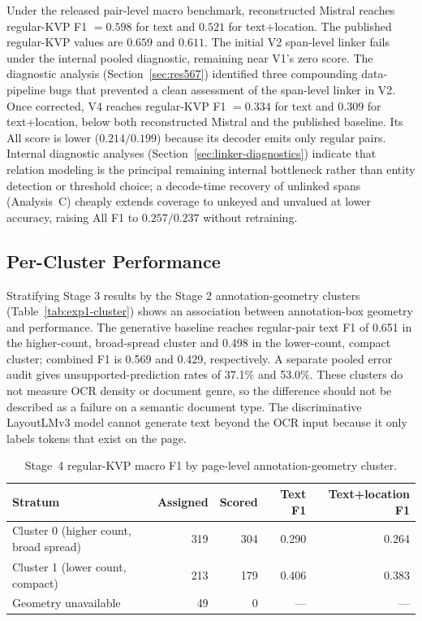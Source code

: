 Under the released pair-level macro benchmark, reconstructed Mistral reaches
regular-KVP F1 $=0.598$ for text and $0.521$ for text+location. The published
regular-KVP values are $0.659$ and $0.611$. The initial V2 span-level linker
fails under the internal pooled diagnostic, remaining near V1's zero score.
The diagnostic analysis (Section~\ref{sec:res567}) identified three compounding
data-pipeline bugs that prevented a clean assessment of the span-level linker
in V2. Once corrected, V4 reaches regular-KVP F1 $=0.334$ for text
and $0.309$ for text+location, below both reconstructed Mistral and the
published baseline. Its All score is lower ($0.214/0.199$) because its decoder
emits only regular pairs. Internal diagnostic analyses
(Section~\ref{sec:linker-diagnostics}) indicate that relation modeling is the
principal remaining internal bottleneck rather than entity detection or threshold choice;
a decode-time recovery of unlinked spans (Analysis~C) cheaply extends coverage
to unkeyed and unvalued at lower accuracy, raising All F1 to $0.257/0.237$
without retraining.

\subsection{Per-Cluster Performance}

Stratifying Stage 3 results by the Stage 2 annotation-geometry
clusters (Table~\ref{tab:exp1-cluster}) shows an association between
annotation-box geometry and performance. The generative baseline reaches regular-pair text
F1 of 0.651 in the higher-count, broad-spread cluster and 0.498 in the
lower-count, compact cluster; combined F1 is 0.569 and 0.429, respectively.
A separate pooled error audit gives unsupported-prediction rates of 37.1\%
and 53.0\%. These clusters do not measure OCR density or document genre, so
the difference should not be described as a failure on a semantic document
type. The discriminative LayoutLMv3 model cannot generate text beyond the OCR
input because it only labels tokens that exist on the page.

\begin{table}[ht]
  \centering
  \caption{Stage~4 regular-KVP macro F1 by page-level annotation-geometry cluster.}
  \label{tab:stage4-cluster}
  \begin{tabular}{@{}lrrrr@{}}
    \toprule
    \textbf{Stratum} & \textbf{Assigned} & \textbf{Scored} & \textbf{Text F1} & \textbf{Text+location F1} \\
    \midrule
    Cluster 0 (higher count, broad spread) & 319 & 304 & 0.290 & 0.264 \\
    Cluster 1 (lower count, compact)       & 213 & 179 & 0.406 & 0.383 \\
    Geometry unavailable                    &  49 &   0 & ---   & ---   \\
    \bottomrule
  \end{tabular}
\end{table}

